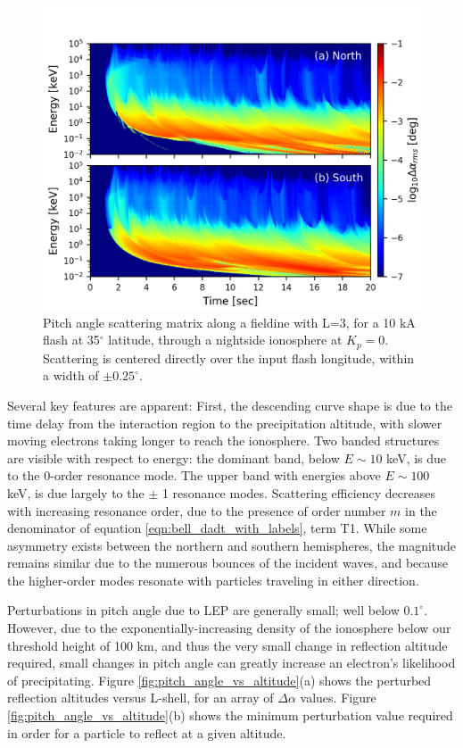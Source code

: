 \begin{figure}[h]
\begin{center}
\includegraphics{figures/dA_E-t_spectra.png}
\caption[Pitch angle scattering matrix for a flash at 35$^\circ$ latitude and L=3]{Pitch angle scattering matrix along a fieldine with L=3, for a 10 kA flash at 35$^\circ$ latitude, through a nightside ionosphere at $K_p=0$. Scattering is centered directly over the input flash longitude, within a width of $\pm0.25^\circ.$}
\label{fig:dA_spectra}
\end{center}
\end{figure}

Several key features are apparent: First, the descending curve shape is due to the time delay from the interaction region to the precipitation altitude, with slower moving electrons taking longer to reach the ionosphere. Two banded structures are visible with respect to energy: the dominant band, below $E \sim 10$ keV, is due to the 0-order resonance mode. The upper band with energies above $E  \sim 100$ keV, is due largely to the $\pm$ 1 resonance modes. Scattering efficiency decreases with increasing resonance order, due to the presence of order number $m$ in the denominator of equation \eqref{eqn:bell_dadt_with_labels}, term T1. While some asymmetry exists between the northern and southern hemispheres, the magnitude remains similar due to the numerous bounces of the incident waves, and because the higher-order modes resonate with particles traveling in either direction.

Perturbations in pitch angle due to LEP are generally small; well below $0.1^\circ$. However, due to the exponentially-increasing density of the ionosphere below our threshold height of 100 km, and thus the very small change in reflection altitude required, small changes in pitch angle can greatly increase an electron's likelihood of precipitating. Figure \ref{fig:pitch_angle_vs_altitude}(a) shows the perturbed reflection altitudes versus L-shell, for an array of $\Delta \alpha$ values. Figure \ref{fig:pitch_angle_vs_altitude}(b) shows the minimum perturbation value required in order for a particle to reflect at a given altitude.

